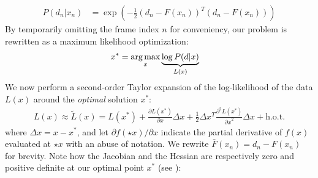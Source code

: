 \iffalse
%
% 
%
% 
\begin{align}
P(d_n|x_n) &= \exp \left( - \tfrac{1}{2}(d_n - F(x_n))^T (d_n - F(x_n)) \right)
\label{eq:posterior}
\end{align}
% 
By temporarily omitting the frame index $n$ for conveniency, our problem is rewritten as a maximum likelihood optimization:
%
\begin{align}
x^* &= \operatorname*{arg\,max}_{x} \underbrace{\log  P(d|x)}_{L(x)}
\label{eq:independent}
\end{align}
%
We now perform a second-order Taylor expansion of the log-likelihood of the data $L(x)$ around the \emph{optimal} solution $x^*$:
%
\begin{align}
L(x) \approx \tilde{L}(x) = L(x^*)   
+ \tfrac{\partial L(x^*) }{\partial x}  \Delta x 
+ \tfrac{1}{2} \Delta x^T\tfrac{\partial^2 L(x^*)}{{\partial x}^2} \Delta x + \text{h.o.t.}
\label{eq:taylor}
\end{align}
%
where $\Delta x=x - x^*$, and let {\small $\partial f(\star{x})/\partial x$} indicate the partial derivative of $f(x)$ evaluated at $\star{x}$  with an abuse of notation. We rewrite {\small $\bar{F}(x_n) = d_n - F(x_n)$} for brevity. Note how the Jacobian and the Hessian are respectively zero and positive definite at our optimal point $x^*$ (see \cite[Sec.~10.2]{nocedal2006numerical}):
